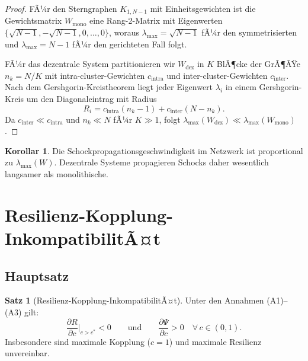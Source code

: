 ﻿\documentclass[a4paper,12pt]{article}
\theoremstyle{definition}
\newtheorem{satz}{Satz}
\newtheorem{korollar}{Korollar}
\begin{document}
\begin{proof}
    FÃ¼r den Sterngraphen $K_{1,N-1}$ mit Einheitsgewichten ist die Gewichtsmatrix
    $W_{\text{mono}}$ eine Rang-2-Matrix mit Eigenwerten
    $\{\sqrt{N-1}, -\sqrt{N-1}, 0, \ldots, 0\}$, woraus $\lambda_{\max} = \sqrt{N-1}$
    fÃ¼r den symmetrisierten und $\lambda_{\max} = N-1$ fÃ¼r den gerichteten Fall folgt.
    
    FÃ¼r das dezentrale System partitionieren wir $W_{\text{dez}}$ in $K$ BlÃ¶cke der GrÃ¶ÃŸe
    $n_k = N/K$ mit intra-cluster-Gewichten $c_{\text{intra}}$ und inter-cluster-Gewichten
    $c_{\text{inter}}$. Nach dem Gershgorin-Kreistheorem liegt jeder Eigenwert $\lambda_i$
    in einem Gershgorin-Kreis um den Diagonaleintrag mit Radius
    \[
        R_i = c_{\text{intra}}(n_k - 1) + c_{\text{inter}}(N - n_k).
    \]
    Da $c_{\text{inter}} \ll c_{\text{intra}}$ und $n_k \ll N$ fÃ¼r $K \gg 1$, folgt
    $\lambda_{\max}(W_{\text{dez}}) \ll \lambda_{\max}(W_{\text{mono}})$.
\end{proof}

\begin{korollar}
    Die Schockpropagationsgeschwindigkeit im Netzwerk ist proportional zu
    $\lambda_{\max}(W)$. Dezentrale Systeme propagieren Schocks daher wesentlich
    langsamer als monolithische.
\end{korollar}

\section{Resilienz-Kopplung-InkompatibilitÃ¤t}

\subsection{Hauptsatz}

\begin{satz}[Resilienz-Kopplung-InkompatibilitÃ¤t]
\label{satz:rki}
    Unter den Annahmen (A1)--(A3) gilt:
    \[
        \frac{\partial R}{\partial c}\bigg|_{c > c^*} < 0
        \qquad\text{und}\qquad
        \frac{\partial \Psi}{\partial c} > 0 \quad \forall\, c \in (0,1).
    \]
    Insbesondere sind maximale Kopplung ($c = 1$) und maximale Resilienz unvereinbar.
\end{satz}
\end{document}
